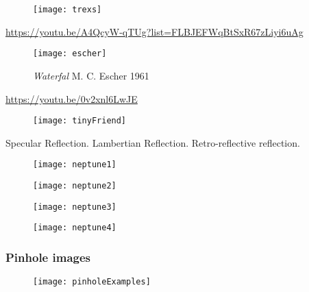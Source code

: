 \begin{frame}
\begin{figure}[!h]
\centering
\texttt{[image: trexs]}
\end{figure}
\url{https://youtu.be/A4QcyW-qTUg?list=FLBJEFWqBtSxR67zLiyi6uAg}
\end{frame}

\begin{frame}
\begin{figure}[!h]
\centering
\texttt{[image: escher]}
\caption{\textit{Waterfal} M. C. Escher 1961}
\end{figure}
\url{https://youtu.be/0v2xnl6LwJE}
\end{frame}

\begin{frame}
\begin{figure}[!h]
\centering
\texttt{[image: tinyFriend]}
\end{figure}
\end{frame}

\begin{frame}
Specular Reflection.
Lambertian Reflection.
Retro-reflective reflection.
\end{frame}

\begin{frame}
\begin{figure}[!h]
\centering
\texttt{[image: neptune1]}
\end{figure}
\end{frame}

\begin{frame}
\begin{figure}[!h]
\centering
\texttt{[image: neptune2]}
\end{figure}
\end{frame}

\begin{frame}
\begin{figure}[!h]
\centering
\texttt{[image: neptune3]}
\end{figure}
\end{frame}

\begin{frame}
\begin{figure}[!h]
\centering
\texttt{[image: neptune4]}
\end{figure}
\end{frame}

\begin{frame}
\frametitle{Pinhole images}
\begin{figure}[!h]
\centering
\texttt{[image: pinholeExamples]}
\end{figure}
\end{frame}

